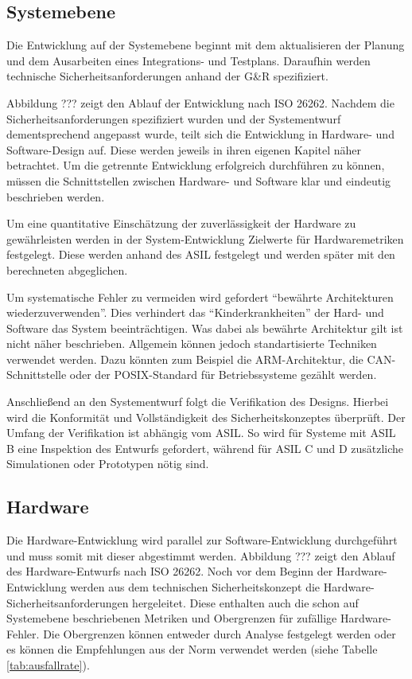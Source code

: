 \documentclass[a4paper,DIV=calc,ngerman]{scrartcl}
\begin{document}
\subsection{Systemebene}
\label{sec:Systemebene}
Die Entwicklung auf der Systemebene beginnt mit dem aktualisieren der Planung und dem Ausarbeiten eines Integrations- und Testplans. Daraufhin werden technische Sicherheitsanforderungen anhand der G\&R spezifiziert.


Abbildung ??? zeigt den Ablauf der Entwicklung nach ISO 26262. Nachdem die Sicherheitsanforderungen spezifiziert wurden und der Systementwurf dementsprechend angepasst wurde, teilt sich die Entwicklung in Hardware- und Software-Design auf. Diese werden jeweils in ihren eigenen Kapitel näher betrachtet. Um die getrennte Entwicklung erfolgreich durchführen zu können, müssen die Schnittstellen zwischen Hardware- und Software klar und eindeutig beschrieben werden.

Um eine quantitative Einschätzung der zuverlässigkeit der Hardware zu gewährleisten werden in der System-Entwicklung Zielwerte für Hardwaremetriken festgelegt. Diese werden anhand des ASIL festgelegt und werden später mit den berechneten abgeglichen.

Um systematische Fehler zu vermeiden wird gefordert "`bewährte Architekturen wiederzuverwenden"'. Dies verhindert das "`Kinderkrankheiten"' der Hard- und Software das System beeinträchtigen. Was dabei als bewährte Architektur gilt ist nicht näher beschrieben. Allgemein können jedoch standartisierte Techniken verwendet werden. Dazu könnten zum Beispiel die ARM-Architektur, die CAN-Schnittstelle oder der POSIX-Standard für Betriebssysteme gezählt werden.

Anschließend an den Systementwurf folgt die Verifikation des Designs. Hierbei wird die Konformität und Vollständigkeit des Sicherheitskonzeptes überprüft. Der Umfang der Verifikation ist abhängig vom ASIL. So wird für Systeme mit ASIL B eine Inspektion des Entwurfs gefordert, während für ASIL C und D zusätzliche Simulationen oder Prototypen nötig sind.




\subsection{Hardware}
\label{sec:Hardware}
Die Hardware-Entwicklung wird parallel zur Software-Entwicklung durchgeführt und muss somit mit dieser abgestimmt werden. Abbildung ??? zeigt den Ablauf des Hardware-Entwurfs nach ISO 26262. Noch vor dem Beginn der Hardware-Entwicklung werden aus dem technischen Sicherheitskonzept die Hardware-Sicherheitsanforderungen hergeleitet. Diese enthalten auch die schon auf Systemebene beschriebenen Metriken und Obergrenzen für zufällige Hardware-Fehler. Die Obergrenzen können entweder durch Analyse festgelegt werden oder es können die Empfehlungen aus der Norm verwendet werden (siehe Tabelle \ref{tab:ausfallrate}). 
\end{document}
